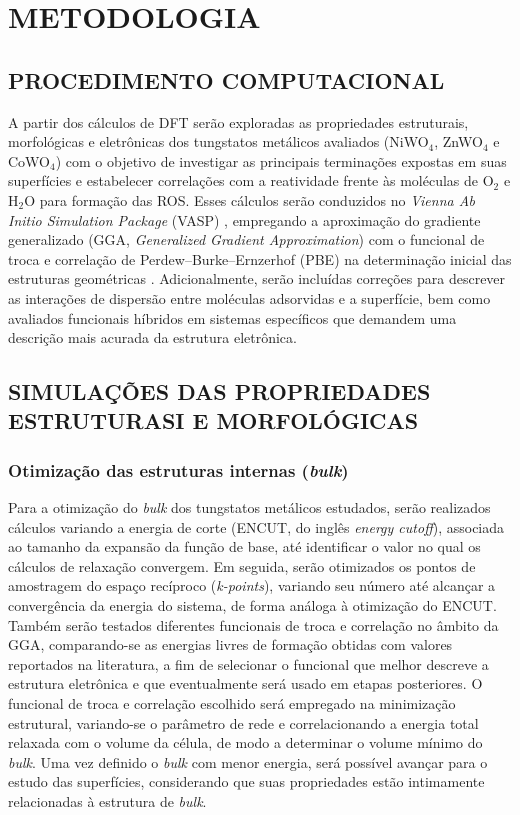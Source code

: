 \chapter{METODOLOGIA}

\section{PROCEDIMENTO COMPUTACIONAL}
A partir dos cálculos de DFT serão exploradas as propriedades estruturais, morfológicas e eletrônicas dos tungstatos metálicos avaliados (NiWO$_4$, ZnWO$_4$ e CoWO$_4$) com o objetivo de investigar as principais terminações expostas em suas superfícies e estabelecer correlações com a reatividade frente às moléculas de O$_2$ e H$_2$O para formação das ROS. Esses cálculos serão conduzidos no \textit{Vienna Ab Initio Simulation Package} (VASP) \cite{kresse1996efficient,kresse1996efficiency}, empregando a aproximação do gradiente generalizado (GGA, \textit{Generalized Gradient Approximation}) com o funcional de troca e correlação de Perdew–Burke–Ernzerhof (PBE) na determinação inicial das estruturas geométricas \cite{perdew1996generalized}. Adicionalmente, serão incluídas correções para descrever as interações de dispersão entre moléculas adsorvidas e a superfície, bem como avaliados funcionais híbridos em sistemas específicos que demandem uma descrição mais acurada da estrutura eletrônica.

\section{SIMULAÇÕES DAS PROPRIEDADES ESTRUTURASI E MORFOLÓGICAS}


\subsection{Otimização das estruturas internas (\textit{bulk})}
Para a otimização do \textit{bulk} dos tungstatos metálicos estudados, serão realizados cálculos variando a energia de corte (ENCUT, do inglês \textit{energy cutoff}), associada ao tamanho da expansão da função de base, até identificar o valor no qual os cálculos de relaxação convergem. Em seguida, serão otimizados os pontos de amostragem do espaço recíproco (\textit{k-points}), variando seu número até alcançar a convergência da energia do sistema, de forma análoga à otimização do ENCUT. Também serão testados diferentes funcionais de troca e correlação no âmbito da GGA, comparando-se as energias livres de formação obtidas com valores reportados na literatura, a fim de selecionar o funcional que melhor descreve a estrutura eletrônica e que eventualmente será usado em etapas posteriores. O funcional de troca e correlação escolhido será empregado na minimização estrutural, variando-se o parâmetro de rede e correlacionando a energia total relaxada com o volume da célula, de modo a determinar o volume mínimo do \textit{bulk}. Uma vez definido o \textit{bulk} com menor energia, será possível avançar para o estudo das superfícies, considerando que suas propriedades estão intimamente relacionadas à estrutura de \textit{bulk}.


